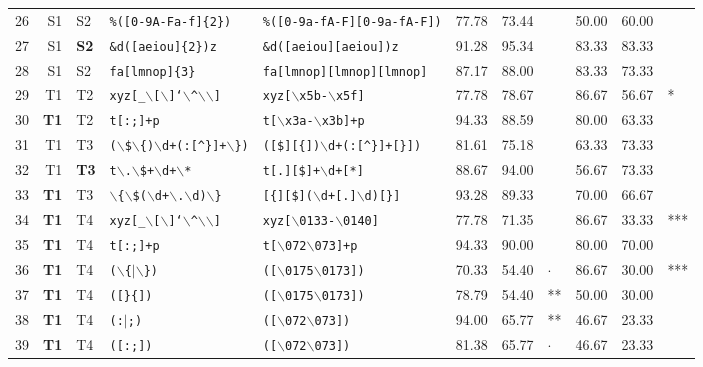 \begin{table*}[ht]
\begin{tabular}{p{0.3cm}r@{ -- }lp{4cm}p{4cm}|p{0.91cm}p{0.91cm}p{0.4cm}|p{0.98cm}p{0.98cm}p{0.4cm}}
  26 & S1 & S2 & {\tt \%([0-9A-Fa-f]\{2\})} & {\tt \%([0-9a-fA-F][0-9a-fA-F])} & 77.78 & 73.44 &   & 50.00 & 60.00 &   \\ 
  27 & S1 & {\bf S2} & {\tt \&d([aeiou]\{2\})z} & {\tt \&d([aeiou][aeiou])z} & 91.28 & 95.34 &   & 83.33 & 83.33 &   \\ 
  28 & S1 & S2 & {\tt fa[lmnop]\{3\}} & {\tt fa[lmnop][lmnop][lmnop]} & 87.17 & 88.00 &   & 83.33 & 73.33 &   \\ 
  \hline
  
  29 & T1 & T2 & {\tt xyz[\_$\backslash$[$\backslash$]`$\backslash$\verb|^|$\backslash$$\backslash$]} & {\tt xyz[$\backslash$x5b-$\backslash$x5f]} & 77.78 & 78.67 &   & 86.67 & 56.67 & * \\ 
  30 & {\bf T1} & T2 & {\tt t[:;]+p} & {\tt t[$\backslash$x3a-$\backslash$x3b]+p} & 94.33 & 88.59 &   & 80.00 & 63.33 &   \\ 
  
  31 & T1 & T3 & {\tt ($\backslash$\$$\backslash$\{)$\backslash$d+(:[\verb|^|\}]+$\backslash$\})} & {\tt ([\$][\{])$\backslash$d+(:[\verb|^|\}]+[\}])} & 81.61 & 75.18 &   & 63.33 & 73.33 &   \\ 
  32 & T1 & {\bf T3} & {\tt t$\backslash$.$\backslash$\$+$\backslash$d+$\backslash$*} & {\tt t[.][\$]+$\backslash$d+[*]} & 88.67 & 94.00 &   & 56.67 & 73.33 &   \\ 
  33 & {\bf T1} & T3 & {\tt $\backslash$\{$\backslash$\$($\backslash$d+$\backslash$.$\backslash$d)$\backslash$\}} & {\tt [\{][\$]($\backslash$d+[.]$\backslash$d)[\}]} & 93.28 & 89.33 &   & 70.00 & 66.67 &   \\ 
  
  34 & {\bf T1} & T4 & {\tt xyz[\_$\backslash$[$\backslash$]`$\backslash$\verb|^|$\backslash$$\backslash$]} & {\tt xyz[$\backslash$0133-$\backslash$0140]} & 77.78 & 71.35 &   & 86.67 & 33.33 & *** \\ 

  35 & {\bf T1} & T4 & {\tt t[:;]+p} & {\tt t[$\backslash$072$\backslash$073]+p} & 94.33 & 90.00 &   & 80.00 & 70.00 &   \\ 
  
  36 & {\bf T1} & T4 & {\tt ($\backslash$\{$|$$\backslash$\})} & {\tt ([$\backslash$0175$\backslash$0173])} & 70.33 & 54.40 & $\cdot$ & 86.67 & 30.00 & *** \\ 
  37 & {\bf T1} & T4 & {\tt ([\}\{])} & {\tt ([$\backslash$0175$\backslash$0173])} & 78.79 & 54.40 & ** & 50.00 & 30.00 &   \\ 
  38 & {\bf T1} & T4 & {\tt (:$|$;)} & {\tt ([$\backslash$072$\backslash$073])} & 94.00 & 65.77 & ** & 46.67 & 23.33 &   \\ 
  39 & {\bf T1} & T4 & {\tt ([:;])} & {\tt ([$\backslash$072$\backslash$073])} & 81.38 & 65.77 & $\cdot$ & 46.67 & 23.33 &   \\ 
  

\end{tabular}
\end{table*}
